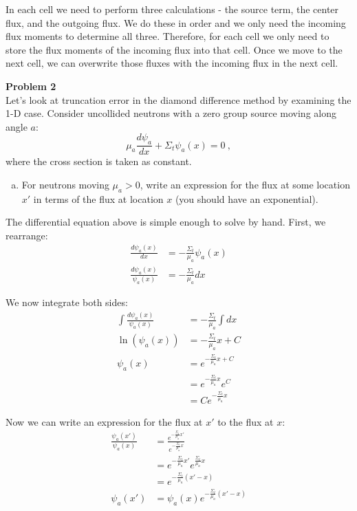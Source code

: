 \documentclass[10pt]{article}
\begin{document}
In each cell we need to perform three calculations - the source term, the center flux, and the outgoing flux. We do these in order and we only need the incoming flux moments to determine all three. Therefore, for each cell we only need to store the flux moments of the incoming flux into that cell. Once we move to the next cell, we can overwrite those fluxes with the incoming flux in the next cell.







\newpage
\noindent \textbf{Problem 2}\\
Let's look at truncation error in the diamond difference method by examining the 1-D case. Consider uncollided neutrons with a zero group source moving along angle $a$:
%
\begin{equation*}
\mu_a \frac{d \psi_a}{dx} + \Sigma_t \psi_a(x) = 0\:,
\end{equation*}
where the cross section is taken as constant.

\begin{enumerate}[(a)]
\item For neutrons moving $\mu_a > 0$, write an expression for the flux at some location $x'$ in terms of the flux at location $x$ (you should have an exponential).
\end{enumerate}

The differential equation above is simple enough to solve by hand. First, we rearrange:
%
\begin{align*}
    \frac{d\psi_a(x)}{dx} &= -\frac{\Sigma_t}{\mu_a } \psi_a(x) \\
    \frac{d\psi_a(x)}{\psi_a(x)} &= -\frac{\Sigma_t}{\mu_a } dx
\end{align*}

We now integrate both sides:
%
\begin{align*}
    \int \frac{d\psi_a(x)}{\psi_a(x)} &= -\frac{\Sigma_t}{\mu_a } \int dx \\
    \ln(\psi_a(x)) &= -\frac{\Sigma_t}{\mu_a }x + C \\
    \psi_a(x) &= e^{-\frac{\Sigma_t}{\mu_a }x + C} \\
    &= e^{-\frac{\Sigma_t}{\mu_a }x}e^C \\
    &= Ce^{-\frac{\Sigma_t}{\mu_a }x}
\end{align*}

Now we can write an expression for the flux at $x'$ to the flux at $x$:
%
\begin{align*}
    \frac{\psi_a(x')}{\psi_a(x)} &= \frac{e^{-\frac{\Sigma_t}{\mu_a }x'}}{e^{-\frac{\Sigma_t}{\mu_a }x}} \\
    &= e^{-\frac{\Sigma_t}{\mu_a }x'} e^{\frac{\Sigma_t}{\mu_a }x} \\
    &= e^{-\frac{\Sigma_t}{\mu_a }(x' - x)} \\
    \psi_a(x') &= \psi_a(x)e^{-\frac{\Sigma_t}{\mu_a }(x' - x)}
\end{align*}
\end{document}

